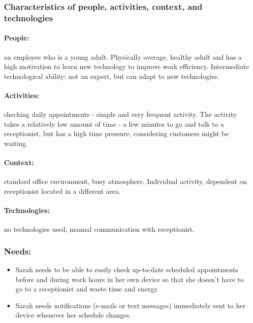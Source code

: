 \documentclass{article}
\begin{document}
\subsubsection{Characteristics of people, activities, context, and technologies}
\paragraph{\small People:}  an employee who is a young adult. Physically average, healthy adult and has a high motivation to learn new technology to improve work efficiency. Intermediate technological ability: not an expert, but can adapt to new technologies.
\paragraph{\small Activities:} checking daily appointments - simple and very frequent activity. The activity takes a relatively low amount of time - a few minutes to go and talk to a receptionist, but has a high time pressure, considering customers might be waiting.
\paragraph{\small Context:} standard office environment, busy atmosphere. Individual activity, dependent on receptionist located in a different area.
\paragraph{\small Technologies:} no technologies used, manual communication with receptionist.

\subsubsection{Needs:}
\begin{itemize}
\item Sarah needs to be able to easily check up-to-date scheduled appointments before and during work hours in her own device so that she doesn't have to go to a receptionist and waste time and energy.
\item Sarah needs notifications (e-mails or text messages) immediately sent to her device whenever her schedule changes.
\end{itemize}
\end{document}
